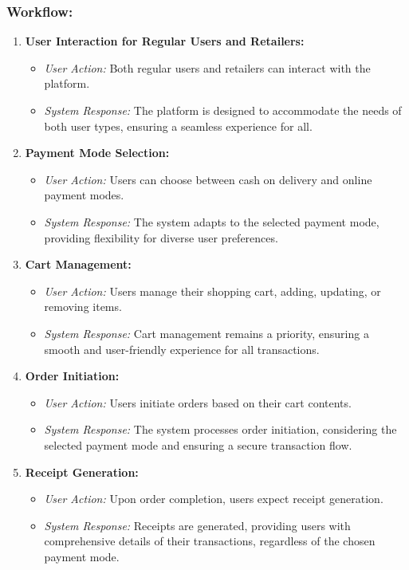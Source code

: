 \documentclass[a4paper,12pt]{article}
\begin{document}
\subsubsection{Workflow:}
\begin{enumerate}

\item \textbf{User Interaction for Regular Users and Retailers:}
   \begin{itemize}
      \item \textit{User Action:} Both regular users and retailers can interact with the platform.
      \item \textit{System Response:} The platform is designed to accommodate the needs of both user types, ensuring a seamless experience for all.
   \end{itemize}

\item \textbf{Payment Mode Selection:}
   \begin{itemize}
      \item \textit{User Action:} Users can choose between cash on delivery and online payment modes.
      \item \textit{System Response:} The system adapts to the selected payment mode, providing flexibility for diverse user preferences.
   \end{itemize}

\item \textbf{Cart Management:}
   \begin{itemize}
      \item \textit{User Action:} Users manage their shopping cart, adding, updating, or removing items.
      \item \textit{System Response:} Cart management remains a priority, ensuring a smooth and user-friendly experience for all transactions.
   \end{itemize}

\item \textbf{Order Initiation:}
   \begin{itemize}
      \item \textit{User Action:} Users initiate orders based on their cart contents.
      \item \textit{System Response:} The system processes order initiation, considering the selected payment mode and ensuring a secure transaction flow.
   \end{itemize}

\item \textbf{Receipt Generation:}
   \begin{itemize}
      \item \textit{User Action:} Upon order completion, users expect receipt generation.
      \item \textit{System Response:} Receipts are generated, providing users with comprehensive details of their transactions, regardless of the chosen payment mode.
   \end{itemize}

\end{enumerate}
\end{document}
